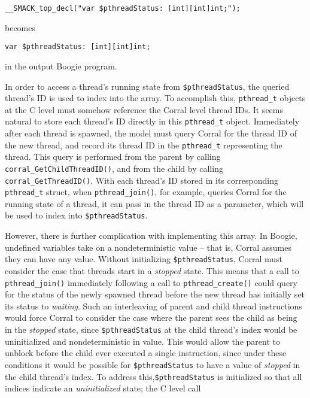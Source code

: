 \begin{lstlisting}[frame=none,xleftmargin=2\parindent]
__SMACK_top_decl("var $pthreadStatus: [int][int]int;");
\end{lstlisting}

\noindent becomes

\begin{lstlisting}[frame=none,xleftmargin=2\parindent,language=boogie]
var $pthreadStatus: [int][int]int;
\end{lstlisting}

\noindent in the output Boogie program.

In order to access a thread's running state from
\lstinline|$pthreadStatus|, the queried thread's ID is used to index
into the array.  To accomplish this, \lstinline|pthread_t| objects at
the C level must somehow  reference the Corral level thread IDs. It
seems natural to store each thread's ID directly in this
\lstinline|pthread_t| object. Immediately after each thread is
spawned, the model must query Corral for the thread ID of the new
thread, and record its thread ID in the \lstinline|pthread_t|
representing the thread.  This query is performed from the parent by
calling \lstinline|corral_GetChildThreadID()|, and from the child by
calling \lstinline|corral_GetThreadID()|.  With each thread's ID
stored in its corresponding \lstinline|pthread_t| struct, when
\lstinline|pthread_join()|, for example, queries Corral for the
running state of a thread, it can pass in the thread ID as a
parameter, which will be used to index into
\lstinline|$pthreadStatus|. 

However, there is further complication with implementing this
array. In Boogie, undefined variables take on a nondeterministic value
-- that is, Corral assumes they can have any value.  Without
initializing \lstinline|$pthreadStatus|, Corral must consider the case
that threads start in a \emph{stopped} state.  This means that a call
to \lstinline|pthread_join()| immediately following a call to
\lstinline|pthread_create()| could query for the status of the newly
spawned thread before the new thread has initially set its status to
\emph{waiting}.  Such an interleaving of parent and child thread
instructions would force Corral to consider the case where the parent
sees the child as being in the \emph{stopped} state, since
\lstinline|$pthreadStatus| at the child thread's index would be
uninitialized and nondeterministic in value.  This would allow the
parent to unblock before the child ever executed a single
instruction, since under these conditions it would be possible for
\lstinline|$pthreadStatus| to have a value of \emph{stopped} in the
child thread's index. To address this,\lstinline|$pthreadStatus| is
initialized so that all indices indicate an \emph{uninitialized}
state; the C level call  
 
